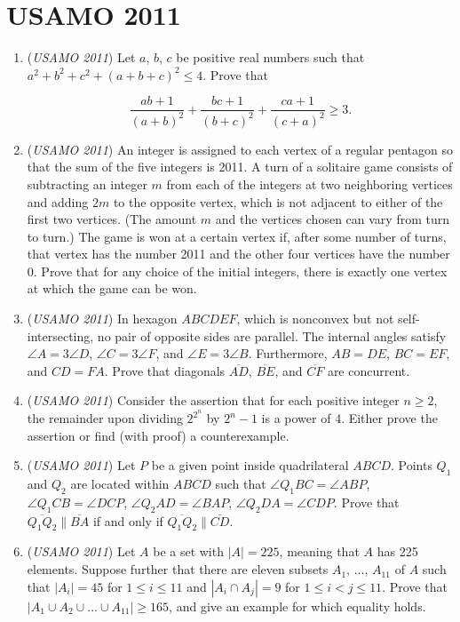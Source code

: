 \section{USAMO 2011}
        \begin{enumerate}
        	\item (\textit{USAMO 2011}) Let $a$, $b$, $c$ be positive real numbers such that $a^2 + b^2 + c^2 + (a + b + c)^2 \le 4$.  Prove that

 \[\frac{ab + 1}{(a + b)^2} + \frac{bc + 1}{(b + c)^2} + \frac{ca + 1}{(c + a)^2} \ge 3.\]


	\item (\textit{USAMO 2011}) An integer is assigned to each vertex of a regular pentagon so that the sum of the five integers is 2011. A turn of a solitaire game consists of subtracting an integer $m$ from each of the integers at two neighboring vertices and adding $2m$ to the opposite vertex, which is not adjacent to either of the first two vertices. (The amount $m$ and the vertices chosen can vary from turn to turn.) The game is won at a certain vertex if, after some number of turns, that vertex has the number 2011 and the other four vertices have the number 0. Prove that for any choice of the initial integers, there is exactly one vertex at which the game can be won.


 

	\item (\textit{USAMO 2011}) In hexagon $ABCDEF$, which is nonconvex but not self-intersecting, no pair of opposite sides are parallel.  The internal angles satisfy $\angle A = 3 \angle D$, $\angle C = 3 \angle F$, and $\angle E = 3 \angle B$.  Furthermore, $AB = DE$, $BC = EF$, and $CD = FA$.  Prove that diagonals $\overline{AD}$, $\overline{BE}$, and $\overline{CF}$ are concurrent.


 

	\item (\textit{USAMO 2011}) Consider the assertion that for each positive integer $n \ge 2$, the remainder upon dividing $2^{2^n}$ by $2^n - 1$ is a power of 4.  Either prove the assertion or find (with proof) a counterexample.


 

	\item (\textit{USAMO 2011}) Let $P$ be a given point inside quadrilateral $ABCD$.  Points $Q_1$ and $Q_2$ are located within $ABCD$ such that $\angle Q_1 BC = \angle ABP$, $\angle Q_1 CB = \angle DCP$, $\angle Q_2 AD = \angle BAP$, $\angle Q_2 DA = \angle CDP$.  Prove that $\overline{Q_1 Q_2} \parallel \overline{BA}$ if and only if $\overline{Q_1 Q_2} \parallel \overline{CD}$.


 

	\item (\textit{USAMO 2011}) Let $A$ be a set with $|A| = 225$, meaning that $A$ has 225 elements.  Suppose further that there are eleven subsets $A_1$, $\dots$, $A_{11}$ of $A$ such that $|A_i | = 45$ for $1 \le i \le 11$ and $|A_i \cap A_j| = 9$ for $1 \le i < j \le 11$.  Prove that $|A_1 \cup A_2 \cup \dots \cup A_{11}| \ge 165$, and give an example for which equality holds.


 

\end{enumerate}